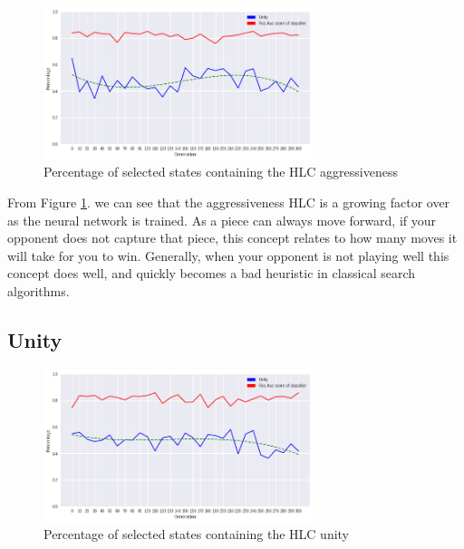 \begin{figure}[]
    \centering
    \includegraphics[width=0.7\textwidth]{graphics/most_advanced_trend.png}
    \caption{Percentage of selected states containing the HLC aggressiveness}
    \label{fig:aggressiveness}
\end{figure}

From Figure \ref{fig:aggressiveness}. we can see that the aggressiveness HLC is a growing factor over as the neural network is trained. As a piece can always move forward, if your opponent does not capture that piece, this concept relates to how many moves it will take for you to win. Generally, when your opponent is not playing well this concept does well, and quickly becomes a bad heuristic in classical search algorithms.

\subsection{Unity}

\begin{figure}[]
    \centering
    \includegraphics[width=0.7\textwidth]{graphics/unity_trend.png}
    \caption{Percentage of selected states containing the HLC unity}
    \label{fig:unity}
\end{figure}

